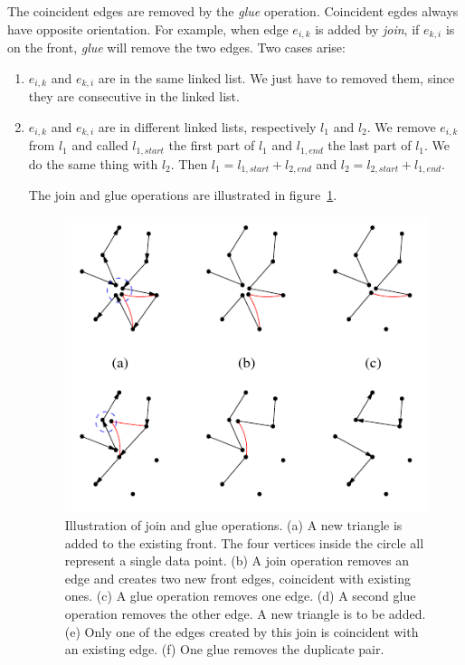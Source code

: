 \documentclass[12pt]{article}
\begin{document}
The coincident edges are removed by the \textit{glue} operation. Coincident egdes always have opposite orientation. For example, when edge $e_{i,k}$ is added by \textit{join}, if $e_{k,i}$ is on the front, \textit{glue} will remove the two edges. Two cases arise:
\begin{enumerate}
\item $e_{i,k}$ and $e_{k,i}$ are in the same linked list. We just have to removed them, since they are consecutive in the linked list.
\item $e_{i,k}$ and $e_{k,i}$ are in different linked lists, respectively $l_1$ and $l_2$. We remove $e_{i,k}$ from $l_1$ and called $l_{1,start}$ the first part of $l_1$ and $l_{1,end}$ the last part of $l_1$. We do the same thing with $l_2$. Then $l_1 = l_{1,start}+l_{2,end}$ and $l_2 = l_{2,start}+l_{1,end}$.

The join and glue operations are illustrated in figure~\ref{joinglue}.

\begin{figure}[h]
  \centering
  \includegraphics[scale=0.5]{joinglue.png}
  \caption{\label{joinglue} Illustration of join and glue operations. (a) A new triangle is added to the existing front. The four vertices inside the circle all represent a single data point. (b) A join operation removes an edge and creates two new front edges, coincident with existing ones. (c) A glue operation removes one edge. (d) A second glue operation removes the other edge. A new triangle is to be added. (e) Only one of the edges created by this join is coincident with an existing edge. (f) One glue removes the duplicate pair.
}
\end{figure}


\end{enumerate}
\end{document}
